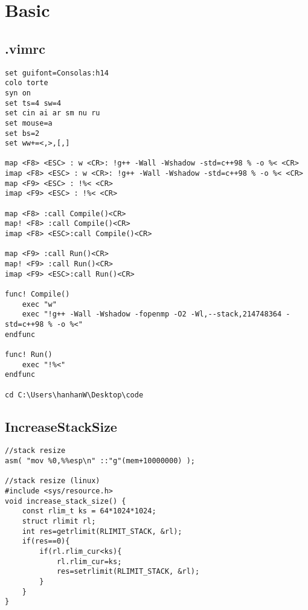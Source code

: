 \documentclass[10pt,twocolumn,oneside]{article}
\begin{document}
\pagestyle{fancy}
\fancyfoot{}
\fancyhead[R]{\thepage}
\renewcommand{\headrulewidth}{0.4pt}
\renewcommand{\contentsname}{Contents} 

\scriptsize
\tableofcontents
\section{Basic}
\subsection{.vimrc}
\begin{lstlisting}
set guifont=Consolas:h14
colo torte
syn on
set ts=4 sw=4
set cin ai ar sm nu ru
set mouse=a
set bs=2
set ww+=<,>,[,]

map <F8> <ESC> : w <CR>: !g++ -Wall -Wshadow -std=c++98 % -o %< <CR>
imap <F8> <ESC> : w <CR>: !g++ -Wall -Wshadow -std=c++98 % -o %< <CR>
map <F9> <ESC> : !%< <CR>
imap <F9> <ESC> : !%< <CR>

map <F8> :call Compile()<CR>
map! <F8> :call Compile()<CR>
imap <F8> <ESC>:call Compile()<CR>

map <F9> :call Run()<CR>
map! <F9> :call Run()<CR>
imap <F9> <ESC>:call Run()<CR>

func! Compile()
	exec "w"
	exec "!g++ -Wall -Wshadow -fopenmp -O2 -Wl,--stack,214748364 -std=c++98 % -o %<"
endfunc

func! Run()
	exec "!%<"
endfunc

cd C:\Users\hanhanW\Desktop\code
\end{lstlisting}
\subsection{IncreaseStackSize}
\begin{lstlisting}
//stack resize
asm( "mov %0,%%esp\n" ::"g"(mem+10000000) );

//stack resize (linux)
#include <sys/resource.h>
void increase_stack_size() {
	const rlim_t ks = 64*1024*1024;
	struct rlimit rl;
	int res=getrlimit(RLIMIT_STACK, &rl);
	if(res==0){
		if(rl.rlim_cur<ks){
			rl.rlim_cur=ks;
			res=setrlimit(RLIMIT_STACK, &rl);
		}
	}
}
\end{lstlisting}
\end{document}
